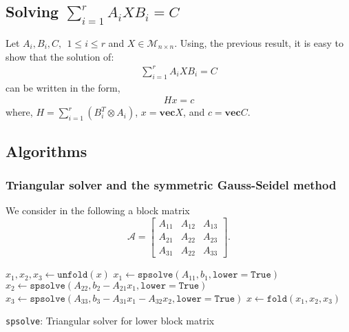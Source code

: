 \subsection{Solving $\sum_{i=1}^r A_i X B_i=C$}
Let $A_i,B_i,C,~~1 \leq i \leq r$ and $X \in \mathcal{M}_{n \times n}$. Using, the previous result, it is easy to show that the solution of:
\begin{align}
\label{kronecker_eq3}
\sum_{i=1}^r A_i X B_i=C
\end{align}
can be written in the form,
\begin{align}
H x = c
\end{align}
where,
$H = \sum_{i=1}^r (B_i^T \otimes A_i)$, $x = \mathbf{vec}X $, and $c = \mathbf{vec}C$.

\subsection{Algorithms}
\subsubsection{Triangular solver and the symmetric Gauss-Seidel method}
We consider in the following a block matrix 
%
\begin{equation} %
\mathcal{A} =\begin{bmatrix}
 A_{11} & A_{12} & A_{13}  \\
 A_{21} & A_{22} & A_{23}  \\
 A_{31} & A_{22} & A_{33}  
\end{bmatrix}.
\end{equation}
%

\begin{algorithm}[H]
\DontPrintSemicolon
\SetAlgoLined
{}
\BlankLine

  $x_1, x_2, x_3 \gets \texttt{unfold}(x)$ \; 
  $x_1 \gets \texttt{spsolve}(A_{11}, b_1, \texttt{lower}=\texttt{True})$                                    
  $x_2 \gets \texttt{spsolve}(A_{22}, b_2 - A_{21} x_1, \texttt{lower}=\texttt{True})$                       
  $x_3 \gets \texttt{spsolve}(A_{33}, b_3 - A_{31} x_1 - A_{32} x_2, \texttt{lower}=\texttt{True})$          
  $x \gets \texttt{fold}(x_1, x_2, x_3)$ \; 

\caption{\texttt{spsolve}: Triangular solver for lower block matrix}
\end{algorithm} 

